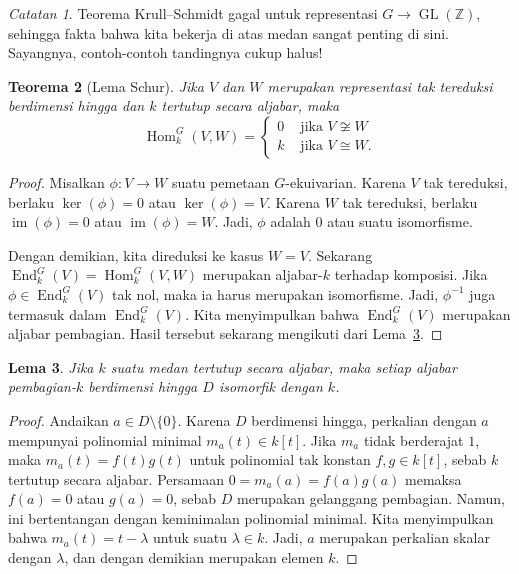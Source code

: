 \documentclass[12pt]{article}
\theoremstyle{plain}
\newtheorem{theorem}{Teorema}[section]
\newtheorem{lemma}[theorem]{Lema}
\theoremstyle{definition}
\theoremstyle{remark}
\newtheorem{remark}[theorem]{Catatan}
\numberwithin{equation}{section}
\begin{document}
\begin{remark}
Teorema Krull--Schmidt gagal untuk representasi $G \to
\operatorname{GL}(\mathbb{Z})$, sehingga fakta bahwa kita bekerja
di atas medan sangat penting di sini.
Sayangnya, contoh-contoh tandingnya cukup halus!
\end{remark}

\begin{theorem}[Lema Schur]
Jika $V$ dan $W$ merupakan representasi tak tereduksi berdimensi hingga
dan $k$ tertutup secara aljabar, maka
\[
\operatorname{Hom}_k^G(V,W) =
\begin{cases}
0 & \textrm{ jika } V \not\cong W\\
k & \textrm{ jika } V \cong W.
\end{cases}
\]
\end{theorem}

\begin{proof}
Misalkan $\phi : V \to W$ suatu pemetaan $G$-ekuivarian.
Karena $V$ tak tereduksi, berlaku $\ker(\phi)=0$ atau $\ker(\phi)=V$.
Karena $W$ tak tereduksi, berlaku $\operatorname{im}(\phi)=0$
atau $\operatorname{im}(\phi)=W$.
Jadi, $\phi$ adalah $0$ atau suatu isomorfisme.

Dengan demikian, kita direduksi ke kasus $W=V$.
Sekarang $\operatorname{End}^G_k(V)=\operatorname{Hom}_k^G(V,W)$
merupakan aljabar-$k$ terhadap komposisi.
Jika $\phi \in \operatorname{End}^G_k(V)$ tak nol, maka ia harus merupakan isomorfisme.
Jadi, $\phi^{-1}$ juga termasuk dalam $\operatorname{End}^G_k(V)$.
Kita menyimpulkan bahwa $\operatorname{End}^G_k(V)$ merupakan aljabar pembagian.
Hasil tersebut sekarang mengikuti dari Lema~\ref{lem:division_over_kbar}.
\end{proof}

\begin{lemma} \label{lem:division_over_kbar}
Jika $k$ suatu medan tertutup secara aljabar,
maka setiap aljabar pembagian-$k$ berdimensi hingga $D$
isomorfik dengan $k$. 
\end{lemma}

\begin{proof}
Andaikan $a \in D \setminus \{0\} $.
Karena $D$ berdimensi hingga, perkalian dengan $a$
mempunyai polinomial minimal $m_a(t) \in k[t]$.
Jika $m_a$ tidak berderajat $1$, maka $m_a(t)=f(t)g(t)$
untuk polinomial tak konstan $f,g \in k[t]$, sebab $k$ tertutup secara
aljabar.
Persamaan $0=m_a(a)=f(a)g(a)$ memaksa $f(a)=0$ atau $g(a)=0$,
sebab $D$ merupakan gelanggang pembagian. Namun, ini bertentangan dengan keminimalan
polinomial minimal. Kita menyimpulkan bahwa $m_a(t)=t-\lambda$ untuk suatu
$\lambda \in k$. Jadi, $a$ merupakan perkalian skalar dengan $\lambda$,
dan dengan demikian merupakan elemen $k$.
\end{proof}
\end{document}
